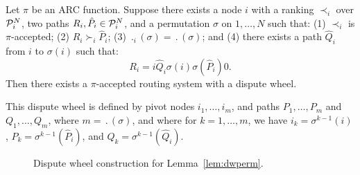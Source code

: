 \begin{lemma}
\label{lem:dwperm}
Let $\pi$ be an ARC function.  Suppose there exists a node $i$ with
a ranking $\prec_i$ over $\P_i^N$, two paths $R_i, \hat{P}_i
\in \P_i^N$, and a permutation $\sigma$ on $1, \ldots, N$ such that:
(1) $\prec_i$ is $\pi$-accepted; (2) $R_i \succ_i \hat{P}_i$; (3)
$\period_i(\sigma) = \period(\sigma)$; and (4) there exists a path
$\hat{Q}_i$ from $i$ to  $\sigma(i)$ such that:
\begin{equation}
R_i = i \hat{Q}_i \sigma(i) \sigma(\hat{P}_i) 0.\label{eq:tailmap}
\end{equation}
Then there exists a $\pi$-accepted routing system with a
dispute wheel. 

This dispute wheel is defined by pivot nodes
$i_1, \ldots, i_m$, and paths $P_1, \ldots, P_m$ and $Q_1, \ldots,
Q_m$, where $m = \period(\sigma)$, and where for $k = 1, \ldots, m$, we have $i_k = \sigma^{k-1}(i)$,
$P_k = \sigma^{k-1}(\hat{P}_i)$, and $Q_k = \sigma^{k-1}(\hat{Q}_i)$.
\end{lemma}



\begin{figure}
\centering
\begin{psfrags}
%
%
\end{psfrags}
\caption{Dispute wheel construction for Lemma~\ref{lem:dwperm}.}
\label{fig:dwperm}
\end{figure}

